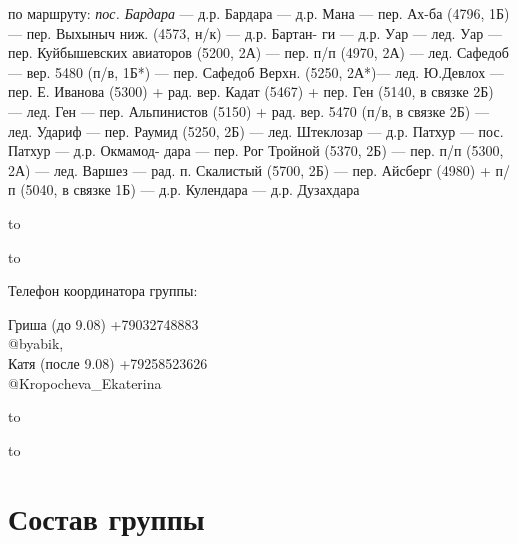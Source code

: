 \documentclass[a5paper, 12pt, twoside]{article}
\begin{document}
        по маршруту: \textit{%
            пос. Бардара} --- д.р. Бардара --- д.р. Мана --- пер. Ах-ба (4796, 1Б) --- пер. Выхыныч ниж. (4573, н/к) --- д.р. Бартан- ги --- д.р. Уар --- лед. Уар --- пер. Куйбышевских авиаторов (5200, 2А) --- пер. п/п (4970, 2А) --- лед. Сафедоб --- вер. 5480 (п/в, 1Б*) --- пер. Сафедоб Верхн. (5250, 2А*)--- лед. Ю.Девлох --- пер. Е. Иванова (5300) + рад. вер. Кадат (5467) + пер. Ген (5140, в связке 2Б) --- лед. Ген --- пер. Альпинистов (5150) + рад. вер. 5470 (п/в, в связке 2Б) --- лед. Удариф --- пер. Раумид (5250, 2Б) --- лед. Штеклозар --- д.р. Патхур --- пос. Патхур --- д.р. Окмамод- дара --- пер. Рог Тройной (5370, 2Б) --- пер. п/п (5300, 2А) --- лед. Варшез --- рад. п. Скалистый (5700, 2Б) --- пер. Айсберг (4980) + п/п (5040, в связке 1Б) --- д.р. Кулендара --- д.р. Дузахдара
        
        \vspace{1.5cm}
        
        \hbox to 

        \hbox to \textwidth{\hfil тел.:
        79508163944}
        \vspace{1cm}
        
        \parbox[t]{0.4\textwidth}{\raggedright Телефон координатора группы:} \hfill \parbox[t]{0.5\textwidth}{\raggedleft Гриша (до 9.08) +79032748883 \\ @byabik,\\\vspace{0.2cm} Катя (после 9.08) +79258523626 \\ @Kropocheva\_Ekaterina}
        \vspace{0.5cm}
        
        \hbox to \textwidth{Телефон МЧС:\hfil
        (83522) 2-40-57, 2-53-47}

        \hbox to 

\newpage %

    \section{Состав группы}
        \newcommand{\myfootnotetext}{\tiny Даю своё согласие на обработку, использование и хранение персональных
        данных, согласно Федеральному закону 152-ФЗ от 27.07.2006 <<О персональных данных>>,
        необходимых для рассмотрения маршрутных и отчетных документов.}
\end{document}
